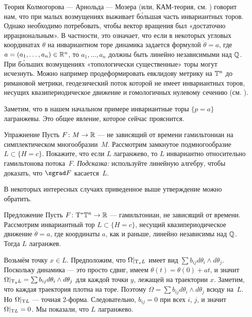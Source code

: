 Теория Колмогорова — Арнольда — Мозера (или, КАМ-теория, см. \cite{Ar})
говорит нам, что при малых возмущениях выживает б\'{о}льшая часть
инвариантных торов. 
Однако необходимо потребовать, чтобы вектор вращения был «достаточно
иррациональным». 
В частности, это означает, что если в некоторых угловых координатах
$\theta$ на инвариантном торе динамика задается формулой $\dot\theta =
a$, где $a = (a_1 ,\dots, a_n) \in \mathbb{R}^n$, то $a_1 ,\dots, a_n$ должны
быть линейно независимыми над $\mathbb{Q}$. 
При б\'{о}льших возмущениях «топологически существенные» торы могут исчезнуть.
Можно например продеформировать евклидову метрику на $\mathbb{T}^n$ до римановой метрики, геодезический поток которой не имеет инвариантных торов, несущих квазипериодическое движение и гомологичных нулевому сечению (см. \cite{AL}). 

Заметим, что в нашем начальном примере инвариантные торы $\{p = a\}$
лагранжевы. 
Это общее явление, которое сейчас прояснится.

\begin{ex}{Упражнение}\label{8.1.A}
Пусть $F\colon M \to \mathbb{R}$ — не зависящий от времени гамильтониан на симплектическом многообразии~$M$.
Рассмотрим замкнутое подмногообразие $L \subset \{H = c\}$.
Покажите, что если $L$ лагранжево, то $L$ инвариантно относительно гамильтонова потока~$F$.
\emph{Подсказка:} используйте линейную алгебру, чтобы доказать, что $\sgrad F$ касается~$L$.
\end{ex}

В некоторых интересных случаях приведенное выше утверждение можно обратить.

\begin{thm}[(\cite{He})]{Предложение}\label{8.1.B}
Пусть $F\colon \mathrm{T}^\ast \mathbb{T}^n \to \mathbb{R}$ — гамильтониан, не зависящий от времени.
Рассмотрим инвариантный тор $L \subset \{H = c\}$, несущий квазипериодическое движение $\dot\theta = a$, где координаты $a$, как и раньше, линейно независимы над $\mathbb{Q}$.
Тогда $L$ лагранжев.
\end{thm}

Возьмём точку $x \in L$.
Предположим, что $\Omega|_{\mathrm{T}_x L}$ имеет вид $\sum b_{ij} d\theta_i
\wedge d\theta_j$. 
Поскольку динамика — это просто сдвиг, имеем $\theta (t) = \theta
(0) + at$, и значит $\Omega|_{\mathrm{T}_y L} = \sum b_{ij} d\theta_i \wedge d\theta_j$ для каждой точки $y$, лежащей на траектории $x$. 
Заметим, что каждая траектория плотна на торе.
Поэтому $\Omega = \sum b_{ij} d\theta_i \wedge d\theta_j$ всюду на~$L$.
Но $\Omega|_{\mathrm{T} L}$ — точная 2-форма.
Следовательно, $b_{ij} = 0$ при всех $i$, $j$, и значит $\Omega|_{\mathrm{T} L} = 0$. 
Мы показали, что $L$ лагранжево.
\qeds

